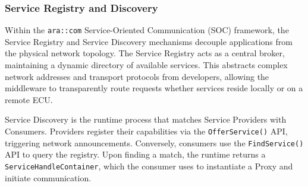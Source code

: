 


\subsubsection{Service Registry and Discovery}

Within the \texttt{ara::com} Service-Oriented Communication (SOC) framework, the Service Registry and Service Discovery mechanisms decouple applications from the physical network topology. The Service Registry acts as a central broker, maintaining a dynamic directory of available services. This abstracts complex network addresses and transport protocols from developers, allowing the middleware to transparently route requests whether services reside locally or on a remote ECU. 

Service Discovery is the runtime process that matches Service Providers with Consumers. Providers register their capabilities via the \texttt{OfferService()} API, triggering network announcements. Conversely, consumers use the \texttt{FindService()} API to query the registry. Upon finding a match, the runtime returns a \texttt{ServiceHandleContainer}, which the consumer uses to instantiate a Proxy and initiate communication.

